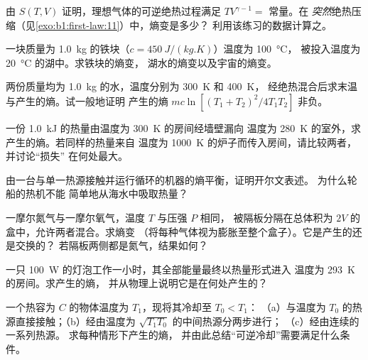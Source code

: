 \begin{exercise}[$\star$]\label{exo:b1:second-law-entropy:4}
由 $S(T, V)$ 证明，理想气体的可逆绝热过程满足
$TV^{\gamma - 1} = $ 常量。在
\emph{突然}绝热压缩（见\cref{exo:b1:first-law:11}）中，熵变是多少？
利用该练习的数据计算之。
\end{exercise}

\begin{exercise}[$\star\star$]\label{exo:b1:second-law-entropy:5}
一块质量为 \qty{1.0}{kg} 的铁块（$c = \qty{450}{J/(kg.K)}$）温度为 \qty{100}{\degreeCelsius}，
被投入温度为 \qty{20}{\degreeCelsius} 的湖中。求铁块的熵变，
湖水的熵变以及宇宙的熵变。
\end{exercise}

\begin{exercise}[$\star\star$]\label{exo:b1:second-law-entropy:6}
两份质量均为 \qty{1.0}{kg} 的水，温度分别为 \qty{300}{K} 和 \qty{400}{K}，
经绝热混合后求末温与产生的熵。试一般地证明
产生的熵 $mc\ln[(T_1 + T_2)^2/4T_1T_2]$ 非负。
\end{exercise}

\begin{exercise}[$\star\star$]\label{exo:b1:second-law-entropy:7}
一份 \qty{1.0}{kJ} 的热量由温度为 \qty{300}{K} 的房间经墙壁漏向
温度为 \qty{280}{K} 的室外，求产生的熵。若同样的热量来自
温度为 \qty{1000}{K} 的炉子而传入房间，请比较两者，并讨论“损失”
在何处最大。
\end{exercise}

\begin{exercise}[$\star\star$]\label{exo:b1:second-law-entropy:8}
由一台与单一热源接触并运行循环的机器的熵平衡，证明开尔文表述。
为什么轮船的热机不能
简单地从海水中吸取热量？
\end{exercise}

\begin{exercise}[$\star\star$]\label{exo:b1:second-law-entropy:9}
一摩尔氮气与一摩尔氧气，温度 $T$ 与压强 $P$ 相同，
被隔板分隔在总体积为 $2V$ 的盒中，允许两者混合。求熵变
（将每种气体视为膨胀至整个盒子）。它是产生的还是交换的？
若隔板两侧都是氮气，结果如何？
\end{exercise}

\begin{exercise}[$\star\star\star$]\label{exo:b1:second-law-entropy:10}
一只 \qty{100}{W} 的灯泡工作一小时，其全部能量最终以热量形式进入
温度为 \qty{293}{K} 的房间。求产生的熵，
并从物理上说明它是在何处产生的？
\end{exercise}

\begin{exercise}[$\star\star\star$]\label{exo:b1:second-law-entropy:11}
一个热容为 $C$ 的物体温度为 $T_1$，现将其冷却至 $T_0 < T_1$：
（a）与温度为 $T_0$ 的热源直接接触；（b）经由温度为 $\sqrt{T_1T_0}$ 的中间热源分两步进行；
（c）经由连续的一系列热源。
求每种情形下产生的熵，
并由此总结“可逆冷却”需要满足什么条件。
\end{exercise}

